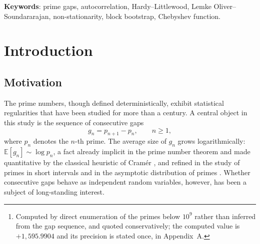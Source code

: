 \documentclass[11pt]{article}
\begin{document}
\begin{abstract}
We also report a direct test of the Lemke Oliver--Soundararajan (LO-S)
conjecture mod 3: the ``stay'' probability
$P(p_{n+1} \equiv a \mid p_n \equiv a)$ for $a \in \{1, 2\}$ is
$0.44509$ and $0.44514$ respectively, deviating from $1/2$ by
approximately $-0.055$ at a $z$-score of approximately $-553\sigma$.
The
suppression is the same in both residue classes (the difference
corresponds to $z = 0.33$), but the corresponding conditional
autocorrelations differ between $a = 1$ and $a = 2$ by $3.6$--$4.5$
standard errors at $k = 1, 2, 3$; the symmetry is therefore
approximate. This is
the strongest signal in the paper, and it confirms the LO-S bias for
mod~3; a
quantitative test of the conjectured per-class constants is left
open. Within the largest window, the lag-$k$ autocorrelations satisfy
$\rho_k \approx \rho_1/k$ for $k \le 5$ to within $8\%$; the ratio
remains approximately monotone at higher lags but with increasing
deviation.

An inclusion--exclusion extension of the naive Hardy--Littlewood
pair-density heuristic reproduces the observed pair ratios to within
0.37\% mean absolute error --- a nearly tenfold ($9.6\times$)
improvement --- without any
fitted constants. As a byproduct of the analysis, the telescoping
identity for $\delta_n$ yields $\psi(10^9) - 10^9 = +1{,}595.99$,
consistent with the explicit bounds of B\"uthe.\footnote{Computed by
direct enumeration of the primes below $10^9$ rather than inferred from
the gap sequence, and quoted conservatively; the computed value is
$+1{,}595.9904$ and its precision is stated once, in Appendix~A.}
\end{abstract}

\noindent\textbf{Keywords}: prime gaps, autocorrelation,
Hardy--Littlewood, Lemke Oliver--Soundararajan, non-stationarity, block
bootstrap, Chebyshev function.

\section{Introduction}

\subsection{Motivation}
The prime numbers, though defined deterministically, exhibit
statistical regularities that have been studied for more than a
century. A central object in this study is the sequence of consecutive
gaps
\begin{equation}
g_n = p_{n+1} - p_n, \qquad n \ge 1,
\end{equation}
where $p_n$ denotes the $n$-th prime. The average size of $g_n$ grows
logarithmically: $\mathbb{E}[g_n] \sim \log p_n$, a fact already
implicit in the prime number theorem and made quantitative by the
classical heuristic of Cram\'er \cite{Cramer1936}, and refined in the
study of primes in short intervals \cite{Gallagher1976,Maier1985}
and in the asymptotic distribution of primes
\cite{Granville1995}. Whether consecutive
gaps behave as independent random variables, however, has been a
subject of long-standing interest.
\end{document}
